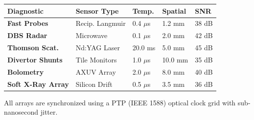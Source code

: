 \documentclass[landscape,a0,final]{a0poster}
\newlength{\colwidth}
\begin{document}
\begin{minipage}[t]{\colwidth}
\begin{tcolorbox}[posterbox, title={\faDatabase\ 4. Diagnostic Performance Matrix}]
    \vspace{4pt}
    \small
    \begin{tabularx}{\linewidth}{>{\bfseries}Y L{2.2cm} C{1.8cm} C{1.8cm} R{1.6cm}}
      \hline
      \color{white} Diagnostic & \color{white} Sensor Type & \color{white} Temp. & \color{white} Spatial & \color{white} SNR \\
      \hline
      Fast Probes & Recip. Langmuir & 0.4 \(\mu\)s & 1.2 mm & 38 dB \\
      DBS Radar & Microwave & 0.1 \(\mu\)s & 2.0 mm & 42 dB \\
      Thomson Scat. & Nd:YAG Laser & 20.0 ms & 5.0 mm & 45 dB \\
      Divertor Shunts & Tile Monitors & 1.0 \(\mu\)s & 10.0 mm & 35 dB \\
      Bolometry & AXUV Array & 2.0 \(\mu\)s & 8.0 mm & 40 dB \\
      Soft X-Ray Array & Silicon Drift & 0.5 \(\mu\)s & 3.5 mm & 36 dB \\
      \hline
    \end{tabularx}
    \vspace{4pt}

    All arrays are synchronized using a PTP (IEEE 1588) optical clock grid with sub-nanosecond jitter.
  \end{tcolorbox}

\end{minipage}%
\hfill%
\end{document}
